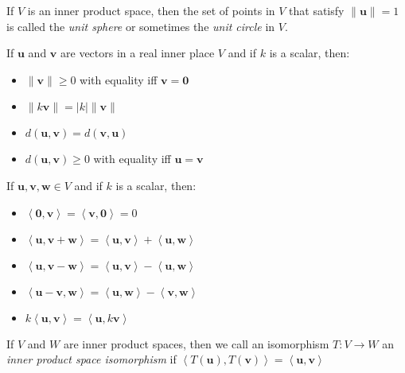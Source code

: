 \documentclass{report}
\begin{document}
			If $V$ is an inner product space, then the set of points in $V$ that satisfy $\|\bm{u}\|=1$ is called the \emph{unit sphere} or sometimes the \emph{unit circle} in $V$.
			
			\begin{thm}
				If $\bm{u}$ and $\bm{v}$ are vectors in a real inner place $V$ and if $k$ is a scalar, then:
				\begin{itemize}
					\item $\|\bm{v}\| \ge 0$ with equality iff $\bm{v}=\bm{0}$
					\item $\|k\bm{v}\|=|k|\|\bm{v}\|$
					\item $d(\bm{u},\bm{v})=d(\bm{v},\bm{u})$
					\item $d(\bm{u},\bm{v}) \ge 0$ with equality iff $\bm{u}=\bm{v}$
				\end{itemize}
			\end{thm}
			
			\begin{thm}
				If $\bm{u}, \bm{v}, \bm{w} \in V$ and if $k$ is a scalar, then:
				\begin{itemize}
					\item $\left< \bm{0} , \bm{v} \right>=\left< \bm{v} , \bm{0} \right>=0$
					\item $\left< \bm{u} , \bm{v}+\bm{w} \right>=\left< \bm{u} , \bm{v} \right>+\left< \bm{u} , \bm{w} \right>$
					\item $\left< \bm{u} , \bm{v}-\bm{w} \right>=\left< \bm{u} , \bm{v} \right>-\left< \bm{u} , \bm{w} \right>$
					\item $\left< \bm{u}-\bm{v} , \bm{w} \right>=\left< \bm{u} , \bm{w} \right>-\left< \bm{v} , \bm{w} \right>$
					\item $k\left< \bm{u} , \bm{v} \right>=\left< \bm{u} , k\bm{v} \right>$
				\end{itemize}
			\end{thm}
			
			\begin{defn}
				If $V$ and $W$ are inner product spaces, then we call an isomorphism $T:V \rightarrow W$ an \emph{inner product space isomorphism} if $\left<T(\bm{u}),T(\bm{v})\right>=\left<\bm{u},\bm{v}\right>$
			\end{defn}
		
\end{document}

